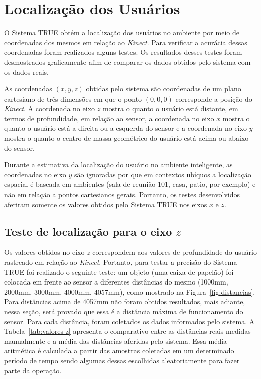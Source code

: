 \section{Localização dos Usuários}
\label{sec:testes-localizacao}

O Sistema TRUE obtém a localização dos usuários no ambiente por meio de
coordenadas dos mesmos em relação ao \textit{Kinect}. Para verificar a acurácia
dessas coordenadas foram realizados alguns testes. Os resultados desses testes
foram desmostrados graficamente afim de comparar os dados obtidos
pelo sistema com os dados reais.

As coordenadas $\displaystyle (x, y, z)$ obtidas pelo sistema são coordenadas de
um plano cartesiano de três dimensões em que o ponto $\displaystyle (0, 0, 0)$
corresponde a posição do \textit{Kinect}. A coordenada no eixo  $\displaystyle
z$ mostra o quanto o usuário está distante, em termos de profundidade, em
relação ao sensor, a coordenada no eixo  $\displaystyle x$ mostra o quanto o
usuário está a direita ou a esquerda do sensor e a coordenada no eixo 
$\displaystyle y$ mostra o quanto o centro de massa geométrico do usuário está
acima ou abaixo do sensor.

Durante a estimativa da localização do usuário no ambiente inteligente, as
coordenadas no eixo  $\displaystyle y$ são ignoradas por que em contextos
ubíquos a localização espacial é baseada em ambientes (sala de
reunião 101, casa, patio, por exemplo) e não em relação a pontos cartesianos
gerais. Portanto, os testes desenvolvidos aferiram somente os valores obtidos
pelo Sistema TRUE nos eixos $\displaystyle x$ e $\displaystyle z$.

\subsection{Teste de localização para o eixo $\displaystyle z$}

	Os valores obtidos no eixo $\displaystyle z$ correspondem aos valores de
	profundidade do usuário rastreado em relação ao \textit{Kinect}. Portanto, para
	testar a precisão do Sistema TRUE foi realizado o seguinte teste: um objeto (uma
	caixa de papelão) foi colocada em frente ao sensor a diferentes distâncias do
	mesmo (1000mm, 2000mm, 3000mm, 4000mm, 4057mm), como mostrado
	na Figura~\ref{fig:distancias}. Para distâncias acima de 4057mm não foram
	obtidos resultados, mais adiante, nessa seção, será provado que essa é a
	distância máxima de funcionamento do sensor. Para cada distância, foram
	coletados os dados informados pelo sistema. A Tabela~\ref{tab:valores-z}
	apresenta o comparativo entre as distâncias reais medidas manualmente e a
	média das distâncias aferidas pelo sistema. Essa média aritmética é calculada
	a partir das amostras coletadas em um determinado período de tempo sendo
	algumas dessas escolhidas aleatoriamente para fazer parte da operação.

